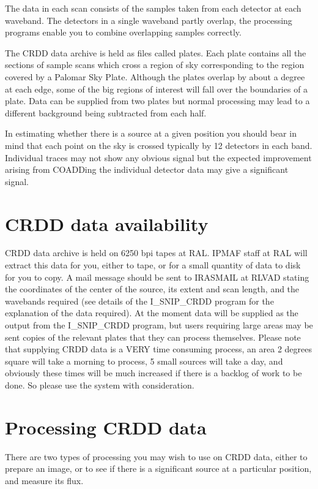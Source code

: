 The data in each scan consists of the samples taken from each detector at each
waveband. The detectors in a single waveband partly overlap, the processing
programs enable you to combine overlapping samples correctly.

The CRDD data archive is held as files called plates. Each plate contains all
the sections of sample scans which cross a region of sky corresponding to the
region covered by a Palomar Sky Plate. Although the plates overlap by about a
degree at each edge, some of the big regions of interest will fall over the
boundaries of a plate. Data can be supplied from two plates but normal
processing may lead to a different background being subtracted from each half.

In estimating whether there is a source at a given position you should bear in
mind that each point on the sky is crossed typically by 12 detectors in each
band. Individual traces may not show any obvious signal but the expected
improvement arising from COADDing the individual detector data may give a
significant signal.

\section {CRDD data availability}

CRDD data archive is held on 6250 bpi tapes at RAL. IPMAF staff at RAL will
extract this data for you, either to tape, or for a small quantity of data to
disk for you to copy. A mail message should be sent to IRASMAIL at RLVAD
stating the coordinates of the center of the source, its extent and scan
length, and the wavebands required (see details of the I\_SNIP\_CRDD program
for the explanation of the data required). At the moment data will be supplied
as the output from the I\_SNIP\_CRDD program, but users requiring large areas
may be sent copies of the relevant plates that they can process themselves.
Please note that supplying CRDD data is a VERY time consuming
process, an area 2 degrees square will take a morning to process, 5 small
sources will take a day, and obviously these times will be much increased if
there is a backlog of work to be done. So please use the system with
consideration.

\section {Processing CRDD data}

There are two types of processing you may wish to use on CRDD data, either to
prepare an image, or to see if there is a significant source at a particular
position, and measure its flux.

